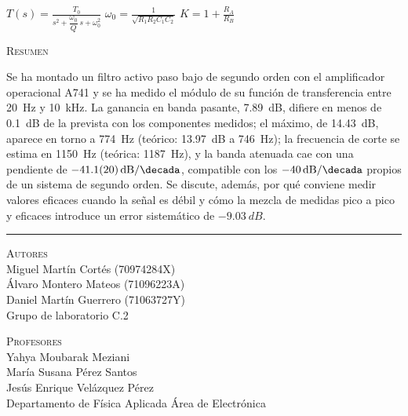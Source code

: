 \documentclass[a4paper,11pt]{article}
\newcommand{\uA}{\textmu A741}
\begin{document}
\begin{titlepage}
\begin{center}
  \vspace{0.55cm}
  {\color{navy!85!black}\small
  $\displaystyle T(s)=\frac{T_0}{s^2+\dfrac{\omega_0}{Q}\,s+\omega_0^2}$\qquad\quad
  $\displaystyle \omega_0=\frac{1}{\sqrt{R_1R_2C_1C_2}}$\qquad\quad
  $\displaystyle K=1+\frac{R_A}{R_B}$\par}
\end{center}

\vspace{0.5cm}
\begin{tcolorbox}[enhanced, colback=fondo, colframe=fondo, arc=0pt, boxrule=0pt,
  borderline west={2.4pt}{0pt}{navy}, left=10pt, right=10pt, top=7pt, bottom=7pt]
  {\color{navy}\small\textsc{Resumen}}\par\vspace{0.2em}
  \footnotesize
  Se ha montado un filtro activo paso bajo de segundo orden con el amplificador operacional \uA{} y se ha medido el módulo de su función de transferencia entre \qty{20}{Hz} y \qty{10}{kHz}. La ganancia en banda pasante, \qty{7,89}{dB}, difiere en menos de \qty{0,1}{dB} de la prevista con los componentes medidos; el máximo, de \qty{14,43}{dB}, aparece en torno a \qty{774}{Hz} (teórico: \qty{13,97}{dB} a \qty{746}{Hz}); la frecuencia de corte se estima en \qty{1150}{Hz} (teórica: \qty{1187}{Hz}), y la banda atenuada cae con una pendiente de $\qty{-41,1(20)}{dB/\decada}$, compatible con los $\qty{-40}{dB/\decada}$ propios de un sistema de segundo orden. Se discute, además, por qué conviene medir valores eficaces cuando la señal es débil y cómo la mezcla de medidas pico a pico y eficaces introduce un error sistemático de $\qty{-9,03}{dB}$.
\end{tcolorbox}

\vfill
{\color{bruma}\rule{\textwidth}{0.6pt}}
\vspace{0.15cm}

\begin{minipage}[t]{0.40\textwidth}
  {\color{azul}\footnotesize\textsc{Autores}}\\[0.35em]
  \small
  Miguel Martín Cortés {\color{gris}\footnotesize(70974284X)}\\
  Álvaro Montero Mateos {\color{gris}\footnotesize(71096223A)}\\
  Daniel Martín Guerrero {\color{gris}\footnotesize(71063727Y)}\\[0.3em]
  {\color{gris}\footnotesize Grupo de laboratorio C.2}
\end{minipage}\hfill
\begin{minipage}[t]{0.50\textwidth}
  {\color{azul}\footnotesize\textsc{Profesores}}\\[0.35em]
  \small
  Yahya Moubarak Meziani\\
  María Susana Pérez Santos\\
  Jesús Enrique Velázquez Pérez\\[0.3em]
  {\color{gris}\footnotesize Departamento de Física Aplicada \textperiodcentered{} Área de Electrónica}
\end{minipage}


\end{titlepage}
\end{document}
